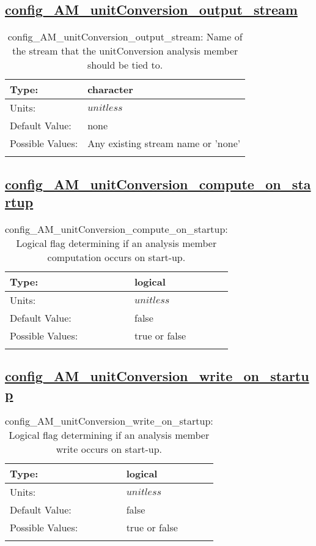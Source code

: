\subsection[config\_AM\_unitConversion\_output\_stream]{\hyperref[sec:nm_tab_AM_unitConversion]{config\_AM\_unitConversion\_output\_stream}}
\label{subsec:nm_sec_config_AM_unitConversion_output_stream}
\begin{center}
\begin{longtable}{| p{2.0in} || p{4.0in} |}
    \hline
    Type: & character \\
    \hline
    Units: & $unitless$ \\
    \hline
    Default Value: & none \\
    \hline
    Possible Values: & Any existing stream name or 'none' \\
    \hline
    \caption{config\_AM\_unitConversion\_output\_stream: Name of the stream that the unitConversion analysis member should be tied to.}
\end{longtable}
\end{center}
\subsection[config\_AM\_unitConversion\_compute\_on\_startup]{\hyperref[sec:nm_tab_AM_unitConversion]{config\_AM\_unitConversion\_compute\_on\_startup}}
\label{subsec:nm_sec_config_AM_unitConversion_compute_on_startup}
\begin{center}
\begin{longtable}{| p{2.0in} || p{4.0in} |}
    \hline
    Type: & logical \\
    \hline
    Units: & $unitless$ \\
    \hline
    Default Value: & false \\
    \hline
    Possible Values: & true or false \\
    \hline
    \caption{config\_AM\_unitConversion\_compute\_on\_startup: Logical flag determining if an analysis member computation occurs on start-up.}
\end{longtable}
\end{center}
\subsection[config\_AM\_unitConversion\_write\_on\_startup]{\hyperref[sec:nm_tab_AM_unitConversion]{config\_AM\_unitConversion\_write\_on\_startup}}
\label{subsec:nm_sec_config_AM_unitConversion_write_on_startup}
\begin{center}
\begin{longtable}{| p{2.0in} || p{4.0in} |}
    \hline
    Type: & logical \\
    \hline
    Units: & $unitless$ \\
    \hline
    Default Value: & false \\
    \hline
    Possible Values: & true or false \\
    \hline
    \caption{config\_AM\_unitConversion\_write\_on\_startup: Logical flag determining if an analysis member write occurs on start-up.}
\end{longtable}
\end{center}

